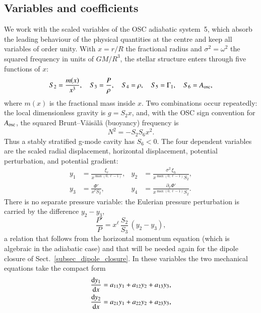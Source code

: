 \documentclass[]{aa}
\begin{document}
\subsection{Variables and coefficients}
\label{sec:variables}

We work with the scaled variables of the OSC adiabatic system~5, which absorb the leading behaviour of the physical quantities at the centre and keep all variables of order unity.  With $x=r/R$ the fractional radius and $\sigma^2=\omega^2$ the squared frequency in units of $GM/R^3$, the stellar structure enters through five functions of $x$:
\begin{equation}
  S_2=\frac{m(x)}{x^3},\quad
  S_3=\frac{P}{\rho},\quad
  S_4=\rho,\quad
  S_5=\Gamma_1,\quad
  S_6=A_{\rm osc},
\end{equation}
where $m(x)$ is the fractional mass inside $x$.  Two combinations occur repeatedly: the local dimensionless gravity is $g=S_2x$, and, with the OSC sign convention for $A_{\rm osc}$, the squared Brunt--V\"ais\"al\"a (buoyancy) frequency is
\begin{equation}
  N^2=-S_2S_6x^2 .
\end{equation}
Thus a stably stratified g-mode cavity has $S_6<0$.  The four dependent variables are the scaled radial displacement, horizontal displacement, potential perturbation, and potential gradient:
\begin{align}
  y_1 &= \frac{\xi_r}{x^{\max(0,\ell-1)}}, &
  y_2 &= \frac{\sigma^2\,\xi_h}{x^{\max(0,\ell-1)}S_2}, \nonumber\\
  y_3 &= \frac{\Phi'}{x^{\ell}S_2}, &
  y_4 &= \frac{\partial_x\Phi'}{x^{\max(0,\ell-1)}S_2}.
  \label{eq:variables}
\end{align}
There is no separate pressure variable: the Eulerian pressure perturbation is carried by the difference $y_2-y_3$,
\begin{equation}
  \frac{P'}{P} = x^{\ell}\,\frac{S_2}{S_3}\,(y_2-y_3),
  \label{eq:pprime}
\end{equation}
a relation that follows from the horizontal momentum equation (which is algebraic in the adiabatic case) and that will be needed again for the dipole closure of Sect.~\ref{subsec_dipole_closure}. In these variables the two mechanical equations take the compact form
\begin{align}
  \frac{{\rm d}y_1}{{\rm d}x} &= a_{11}y_1+a_{12}y_2+a_{13}y_3,
  \label{eq:mech1}\\
  \frac{{\rm d}y_2}{{\rm d}x} &= a_{21}y_1+a_{22}y_2+a_{23}y_3 ,
  \label{eq:mech2}
\end{align}
\end{document}
